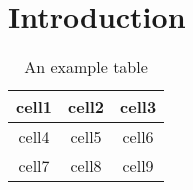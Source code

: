 \chapter{Introduction}
\lipsum[1-3]
\begin{table}[t]
    \centering
    \begin{tabular}{ c | c c }
    \toprule
     cell1 & cell2 & cell3 \\
    \midrule
     cell4 & cell5 & cell6 \\  
     cell7 & cell8 & cell9 \\
    \bottomrule
    \end{tabular}
    \caption{An example table}
    \label{tab:my_label}
\end{table}